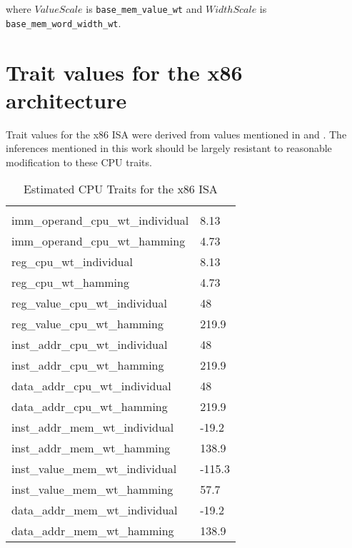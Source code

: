 where $ValueScale$ is \texttt{base\_mem\_value\_wt} and $WidthScale$
is \texttt{base\_mem\_word\_width\_wt}.

\section{Trait values for the x86 architecture}
\label{sec:trait-values}

Trait values for the x86 ISA were derived from values mentioned in
\cite{steinke} and \cite{lee}.  The inferences mentioned in this work
should be largely resistant to reasonable modification to these CPU
traits.

\begin{longtable}{l|l}
  \caption{Estimated CPU Traits for the x86 ISA} \\

  \hline \\

  imm\_operand\_cpu\_wt\_individual & 8.13 \\
  imm\_operand\_cpu\_wt\_hamming & 4.73 \\

  reg\_cpu\_wt\_individual & 8.13 \\
  reg\_cpu\_wt\_hamming & 4.73 \\

  reg\_value\_cpu\_wt\_individual & 48 \\
  reg\_value\_cpu\_wt\_hamming & 219.9 \\

  inst\_addr\_cpu\_wt\_individual & 48 \\
  inst\_addr\_cpu\_wt\_hamming & 219.9 \\

  data\_addr\_cpu\_wt\_individual & 48 \\
  data\_addr\_cpu\_wt\_hamming & 219.9 \\

  inst\_addr\_mem\_wt\_individual & -19.2 \\
  inst\_addr\_mem\_wt\_hamming & 138.9 \\

  inst\_value\_mem\_wt\_individual & -115.3 \\
  inst\_value\_mem\_wt\_hamming & 57.7 \\

  data\_addr\_mem\_wt\_individual & -19.2 \\
  data\_addr\_mem\_wt\_hamming & 138.9 \\


\end{longtable}
